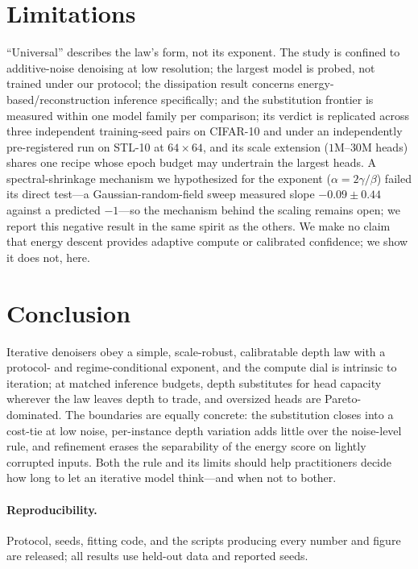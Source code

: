 \documentclass[letterpaper]{article}
\begin{document}
\section{Limitations}
\label{sec:limitations}
``Universal'' describes the law's form, not its exponent. The study is confined to additive-noise
denoising at low resolution; the largest model is probed, not trained under our protocol; the dissipation
result concerns energy-based/reconstruction inference specifically; and the substitution frontier is
measured within one model family per comparison; its verdict is replicated across three independent
training-seed pairs on CIFAR-10 and under an independently pre-registered run on STL-10 at $64\times64$,
and its scale extension ($1$M--$30$M heads) shares one recipe whose epoch budget may undertrain the
largest heads.
A spectral-shrinkage mechanism we hypothesized for the exponent
($\alpha=2\gamma/\beta$) failed its direct test---a Gaussian-random-field sweep measured slope
$-0.09\pm0.44$ against a predicted $-1$---so the mechanism behind the scaling remains open; we report
this negative result in the same spirit as the others. We make no claim that energy descent provides
adaptive compute or calibrated confidence; we show it does not, here.

\section{Conclusion}
Iterative denoisers obey a simple, scale-robust, calibratable depth law with a protocol- and
regime-conditional exponent, and the compute dial is intrinsic to iteration; at matched inference
budgets, depth substitutes for head capacity wherever the law leaves depth to trade, and oversized heads
are Pareto-dominated. The boundaries are equally concrete: the substitution closes into a cost-tie at low
noise, per-instance depth variation adds little over the noise-level rule, and refinement erases the
separability of the energy score on lightly corrupted inputs. Both the rule and its limits should help
practitioners decide how long to let an iterative model think---and when not to bother.

\paragraph{Reproducibility.} Protocol, seeds, fitting code, and the scripts producing every number and figure
are released; all results use held-out data and reported seeds.
\end{document}

